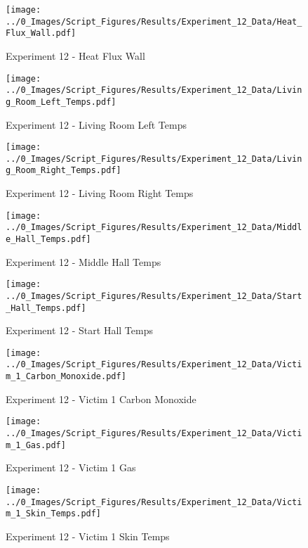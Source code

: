 	\begin{figure}[H]
		\centering
		\texttt{[image: ../0\_Images/Script\_Figures/Results/Experiment\_12\_Data/Heat\_Flux\_Wall.pdf]}
		\caption[]{Experiment 12 - Heat Flux Wall}
	\end{figure}
 
	\clearpage

	\begin{figure}[H]
		\centering
		\texttt{[image: ../0\_Images/Script\_Figures/Results/Experiment\_12\_Data/Living\_Room\_Left\_Temps.pdf]}
		\caption[]{Experiment 12 - Living Room Left Temps}
	\end{figure}
 

	\begin{figure}[H]
		\centering
		\texttt{[image: ../0\_Images/Script\_Figures/Results/Experiment\_12\_Data/Living\_Room\_Right\_Temps.pdf]}
		\caption[]{Experiment 12 - Living Room Right Temps}
	\end{figure}
 
	\clearpage

	\begin{figure}[H]
		\centering
		\texttt{[image: ../0\_Images/Script\_Figures/Results/Experiment\_12\_Data/Middle\_Hall\_Temps.pdf]}
		\caption[]{Experiment 12 - Middle Hall Temps}
	\end{figure}
 

	\begin{figure}[H]
		\centering
		\texttt{[image: ../0\_Images/Script\_Figures/Results/Experiment\_12\_Data/Start\_Hall\_Temps.pdf]}
		\caption[]{Experiment 12 - Start Hall Temps}
	\end{figure}
 
	\clearpage

	\begin{figure}[H]
		\centering
		\texttt{[image: ../0\_Images/Script\_Figures/Results/Experiment\_12\_Data/Victim\_1\_Carbon\_Monoxide.pdf]}
		\caption[]{Experiment 12 - Victim 1 Carbon Monoxide}
	\end{figure}
 

	\begin{figure}[H]
		\centering
		\texttt{[image: ../0\_Images/Script\_Figures/Results/Experiment\_12\_Data/Victim\_1\_Gas.pdf]}
		\caption[]{Experiment 12 - Victim 1 Gas}
	\end{figure}
 
	\clearpage

	\begin{figure}[H]
		\centering
		\texttt{[image: ../0\_Images/Script\_Figures/Results/Experiment\_12\_Data/Victim\_1\_Skin\_Temps.pdf]}
		\caption[]{Experiment 12 - Victim 1 Skin Temps}
	\end{figure}
 

